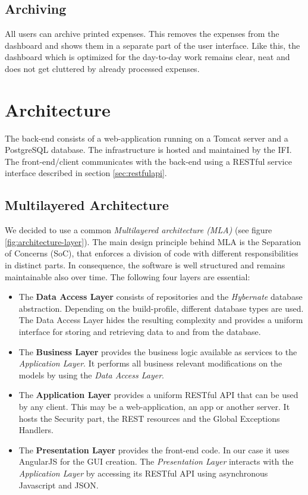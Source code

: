\subsection{Archiving}
All users can archive printed expenses. This removes the expenses from the dashboard and shows them in a separate part of the user interface. Like this, the dashboard which is optimized for the day-to-day work remains clear, neat and does not get cluttered by already processed expenses.

\newpage
\section{Architecture}

The back-end consists of a web-application running on a Tomcat \cite{tomcat} server and a PostgreSQL\cite{postgresql} database. The infrastructure is hosted and maintained by the IFI. The front-end/client communicates with the back-end using a RESTful service interface described in section \ref{sec:restfulapi}.

\subsection{Multilayered Architecture}
We decided to use a common \textit{Multilayered architecture (MLA)}\cite{mla} (see figure \ref{fig:architecture-layer}). The main design principle behind MLA is the Separation of Concerns (SoC), that enforces a division of code with different responsibilities in distinct parts. In consequence, the software is well structured and remains maintainable also over time. The following four layers are essential:
\begin{itemize}
	\item The \textbf{Data Access Layer} consists of repositories and the \textit{Hybernate} database abstraction. Depending on the build-profile, different database types are used. The Data Access Layer hides the resulting complexity and provides a uniform interface for storing and retrieving data to and from the database.
	\item The \textbf{Business Layer} provides the business logic available as services to the \textit{Application Layer}. It performs all business relevant modifications on the models by using the \textit{Data Access Layer}.	
	\item The \textbf{Application Layer} provides a uniform RESTful API that can be used by any client. This may be a web-application, an app or another server. It hosts the Security part, the REST resources and the Global Exceptions Handlers.
	\item The \textbf{Presentation Layer} provides the front-end code. In our case it uses AngularJS for the GUI creation. The \textit{Presentation Layer} interacts with the \textit{Application Layer} by accessing its RESTful API using asynchronous Javascript and JSON.
\end{itemize}

